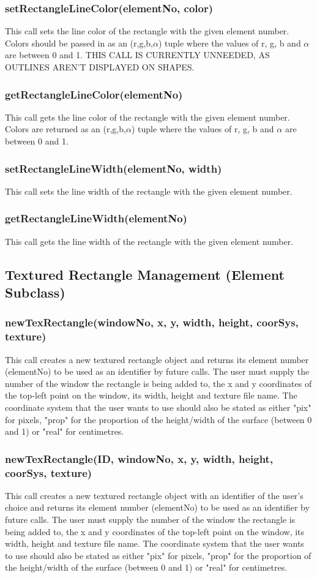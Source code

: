 \documentclass{acm_proc_article-sp}
\begin{document}
\subsubsection{setRectangleLineColor(elementNo, color)}
This call sets the line color of the rectangle with the given element number. Colors should be passed in as an (r,g,b,$\alpha$) tuple where the values of r, g, b and $\alpha$ are between 0 and 1. THIS CALL IS CURRENTLY UNNEEDED, AS OUTLINES AREN'T DISPLAYED ON SHAPES.
\subsubsection{getRectangleLineColor(elementNo)}
This call gets the line color of the rectangle with the given element number. Colors are returned as an (r,g,b,$\alpha$) tuple where the values of r, g, b and $\alpha$ are between 0 and 1.
\subsubsection{setRectangleLineWidth(elementNo, width)}
This call sets the line width of the rectangle with the given element number.
\subsubsection{getRectangleLineWidth(elementNo)}
This call gets the line width of the rectangle with the given element number.
\subsection{Textured Rectangle Management (Element Subclass)}
\subsubsection{newTexRectangle(windowNo, x, y, width, height, coorSys, texture)}
This call creates a new textured rectangle object and returns its element number (elementNo) to be used as an identifier by future calls. The user must supply the number of the window the rectangle is being added to, the x and y coordinates of the top-left point on the window, its width, height and texture file name. The coordinate system that the user wants to use should also be stated as either "pix" for pixels, "prop" for the proportion of the height/width of the surface (between 0 and 1) or "real" for centimetres.
\subsubsection{newTexRectangle(ID, windowNo, x, y, width, height, coorSys, texture)}
This call creates a new textured rectangle object with an identifier of the user's choice and returns its element number (elementNo) to be used as an identifier by future calls. The user must supply the number of the window the rectangle is being added to, the x and y coordinates of the top-left point on the window, its width, height and texture file name. The coordinate system that the user wants to use should also be stated as either "pix" for pixels, "prop" for the proportion of the height/width of the surface (between 0 and 1) or "real" for centimetres.
\end{document}
